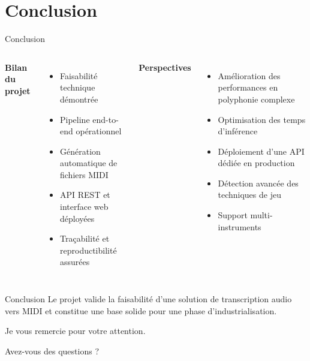 \section{Conclusion}


\begin{frame}{Conclusion}
	\begin{columns}[T]
		
		\textbf{Bilan du projet}
		
		\begin{itemize}
			\item Faisabilité technique démontrée
			\item Pipeline end-to-end opérationnel
			\item Génération automatique de fichiers MIDI
			\item API REST et interface web déployées
			\item Traçabilité et reproductibilité assurées
		\end{itemize}
		
		
		\textbf{Perspectives}
		
		\begin{itemize}
			\item Amélioration des performances en polyphonie complexe
			\item Optimisation des temps d'inférence
			\item Déploiement d'une API dédiée en production
			\item Détection avancée des techniques de jeu
			\item Support multi-instruments
		\end{itemize}
	\end{columns}
	
	\vspace{0.5cm}
	
	\centering
	
	
	\vspace{0.2cm}
	
	\begin{block}{Conclusion}
		Le projet valide la faisabilité d'une solution de transcription audio vers MIDI et constitue une base solide pour une phase d'industrialisation.
	\end{block}
\end{frame}

\begin{frame}
    \centering
    \Huge
    Je vous remercie pour votre attention.

    Avez-vous des questions ?
\end{frame}